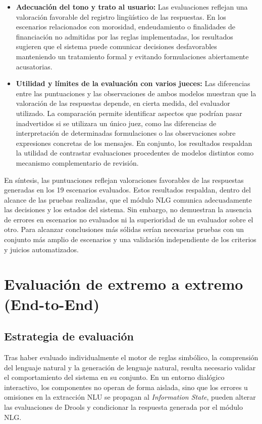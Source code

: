 \documentclass[12pt,a4paper]{report}
\begin{document}
\begin{itemize}
    \item \textbf{Adecuación del tono y trato al usuario:} Las evaluaciones reflejan una valoración favorable del registro lingüístico de las respuestas. En los escenarios relacionados con morosidad, endeudamiento o finalidades de financiación no admitidas por las reglas implementadas, los resultados sugieren que el sistema puede comunicar decisiones desfavorables manteniendo un tratamiento formal y evitando formulaciones abiertamente acusatorias.

    \item \textbf{Utilidad y límites de la evaluación con varios jueces:} Las diferencias entre las puntuaciones y las observaciones de ambos modelos muestran que la valoración de las respuestas depende, en cierta medida, del evaluador utilizado. La comparación permite identificar aspectos que podrían pasar inadvertidos si se utilizara un único juez, como las diferencias de interpretación de determinadas formulaciones o las observaciones sobre expresiones concretas de los mensajes. En conjunto, los resultados respaldan la utilidad de contrastar evaluaciones procedentes de modelos distintos como mecanismo complementario de revisión.
\end{itemize}

En síntesis, las puntuaciones reflejan valoraciones favorables de las respuestas generadas en los 19 escenarios evaluados. Estos resultados respaldan, dentro del alcance de las pruebas realizadas, que el módulo NLG comunica adecuadamente las decisiones y los estados del sistema. Sin embargo, no demuestran la ausencia de errores en escenarios no evaluados ni la superioridad de un evaluador sobre el otro. Para alcanzar conclusiones más sólidas serían necesarias pruebas con un conjunto más amplio de escenarios y una validación independiente de los criterios y juicios automatizados.




\section{Evaluación de extremo a extremo (End-to-End)}

\subsection{Estrategia de evaluación}

Tras haber evaluado individualmente el motor de reglas simbólico, la comprensión del lenguaje natural y la generación de lenguaje natural, resulta necesario validar el comportamiento del sistema en su conjunto. En un entorno dialógico interactivo, los componentes no operan de forma aislada, sino que los errores u omisiones en la extracción NLU se propagan al \textit{Information State}, pueden alterar las evaluaciones de Drools y condicionar la respuesta generada por el módulo NLG.
\end{document}
